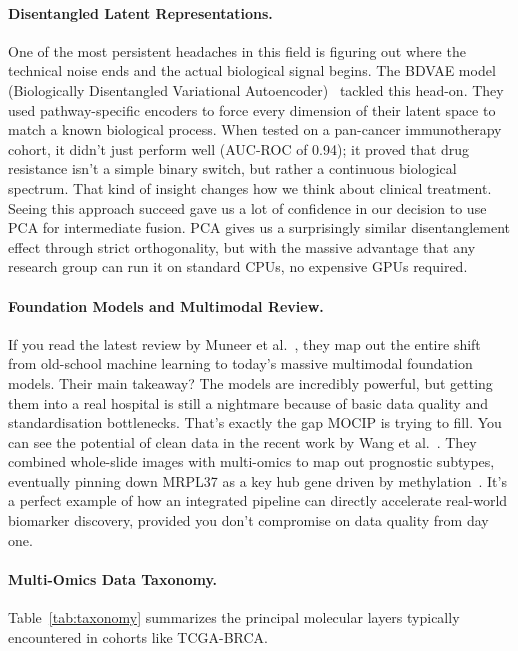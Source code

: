 \documentclass[runningheads]{llncs}
\begin{document}
\paragraph{Disentangled Latent Representations.}
One of the most persistent headaches in this field is figuring out where the technical noise ends and the actual biological signal begins. The BDVAE model (Biologically Disentangled Variational Autoencoder)~\cite{tariq2025bdvae} tackled this head-on. They used pathway-specific encoders to force every dimension of their latent space to match a known biological process. When tested on a pan-cancer immunotherapy cohort, it didn't just perform well (AUC-ROC of 0.94); it proved that drug resistance isn't a simple binary switch, but rather a continuous biological spectrum. That kind of insight changes how we think about clinical treatment. Seeing this approach succeed gave us a lot of confidence in our decision to use PCA for intermediate fusion. PCA gives us a surprisingly similar disentanglement effect through strict orthogonality, but with the massive advantage that any research group can run it on standard CPUs, no expensive GPUs required.

\paragraph{Foundation Models and Multimodal Review.}
If you read the latest review by Muneer et al.~\cite{muneer2025review}, they map out the entire shift from old-school machine learning to today's massive multimodal foundation models. Their main takeaway? The models are incredibly powerful, but getting them into a real hospital is still a nightmare because of basic data quality and standardisation bottlenecks. That's exactly the gap MOCIP is trying to fill. You can see the potential of clean data in the recent work by Wang et al.~\cite{wang2025deeppathomic}. They combined whole-slide images with multi-omics to map out prognostic subtypes, eventually pinning down MRPL37 as a key hub gene driven by methylation~\cite{wang2025deeppathomic}. It's a perfect example of how an integrated pipeline can directly accelerate real-world biomarker discovery, provided you don't compromise on data quality from day one.

\paragraph{Multi-Omics Data Taxonomy.}
Table~\ref{tab:taxonomy} summarizes the principal molecular layers typically encountered in cohorts like TCGA-BRCA.
\end{document}
